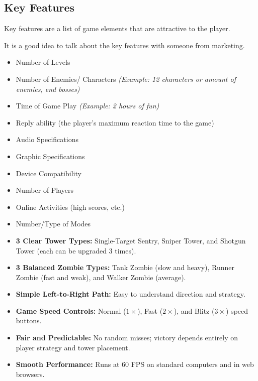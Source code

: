 \subsection{Key Features}

\begin{guidance}
Key features are a list of game elements that are attractive to the player.

It is a good idea to talk about the key features with someone from marketing.

\begin{itemize}[label=\textbullet]
  \item Number of Levels
  \item Number of Enemies/ Characters \textit{(Example: 12 characters or amount of enemies, end bosses)}
  \item Time of Game Play \textit{(Example: 2 hours of fun)}
  \item Reply ability (the player’s maximum reaction time to the game)
  \item Audio Specifications
  \item Graphic Specifications
  \item Device Compatibility
  \item Number of Players
  \item Online Activities (high scores, etc.)
  \item Number/Type of Modes
\end{itemize}
\end{guidance}
\begin{itemize}[label=\textbullet]
  \item \textbf{3 Clear Tower Types:} Single-Target Sentry, Sniper Tower, and Shotgun Tower (each can be upgraded 3 times).
  \item \textbf{3 Balanced Zombie Types:} Tank Zombie (slow and heavy), Runner Zombie (fast and weak), and Walker Zombie (average).
  \item \textbf{Simple Left-to-Right Path:} Easy to understand direction and strategy.
  \item \textbf{Game Speed Controls:} Normal ($1\times$), Fast ($2\times$), and Blitz ($3\times$) speed buttons.
  \item \textbf{Fair and Predictable:} No random misses; victory depends entirely on player strategy and tower placement.
  \item \textbf{Smooth Performance:} Runs at 60 FPS on standard computers and in web browsers.
\end{itemize}

